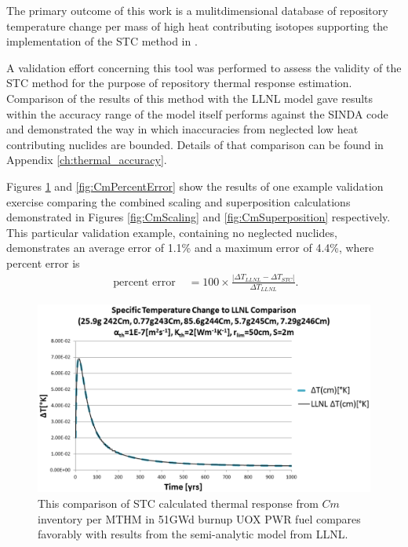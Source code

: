 
The primary outcome of this work is a mulitdimensional database of repository temperature 
change per mass of high heat contributing isotopes supporting the implementation 
of the \gls{STC} method in \Cyder. 

A validation effort concerning this tool was performed to assess the validity 
of the \gls{STC} method for the purpose of repository thermal response 
estimation.  Comparison of the results of this method with the \gls{LLNL} model 
\cite{greenberg_application_2012} gave results within the accuracy range of the 
model itself performs against the SINDA code \cite{huff_numerical_2012} and 
demonstrated the way in which inaccuracies from neglected low heat contributing 
nuclides are bounded. Details of that comparison can be found in Appendix 
\ref{ch:thermal_accuracy}. 

Figures \ref{fig:CmValidation} and \ref{fig:CmPercentError} show the results of 
one example validation exercise comparing the combined scaling and  
superposition calculations demonstrated in Figures \ref{fig:CmScaling} and 
\ref{fig:CmSuperposition} respectively. This particular validation example, 
containing no neglected nuclides, demonstrates an average error of 1.1\% and a 
maximum error of 4.4\%, where percent error is 
\begin{align}
\mbox{ percent error } &= 100\times\frac{\left|\Delta T_{LLNL} - \Delta T_{STC}\right|}{ \Delta T_{LLNL}}.
\end{align}

\begin{figure}[htp!]
\begin{center}
\includegraphics[width=\columnwidth]{./chapters/methodology/thermal_models/CmValidation.eps}
\end{center}
\caption{This comparison of \gls{STC} calculated thermal response from $Cm$ 
inventory per MTHM in 51GWd burnup UOX PWR fuel compares favorably with results 
from the semi-analytic model from LLNL.} 
\label{fig:CmValidation}
\end{figure}

